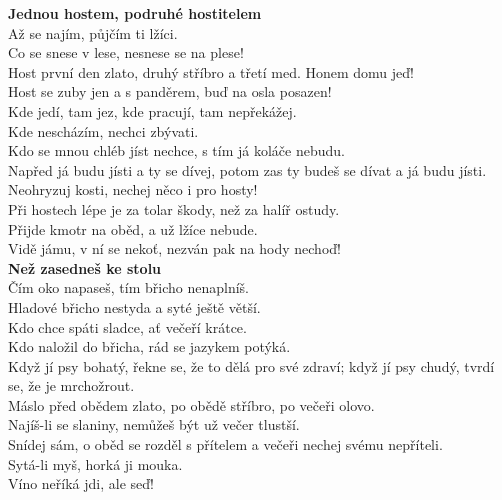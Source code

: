 \begin{multicols}{2}
\noindent
{\large\bf Jednou hostem, podruhé hostitelem}\\[1 mm]
Až se najím, půjčím ti lžíci.\\
Co se snese v lese, nesnese se na plese!\\
Host první den zlato, druhý stříbro a třetí med. Honem domu jeď!\\
Host se zuby jen a s panděrem, buď na osla posazen!\\
Kde jedí, tam jez, kde pracují, tam nepřekážej.\\
Kde nescházím, nechci zbývati.\\
Kdo se mnou chléb jíst nechce, s tím já koláče nebudu.\\
Napřed já budu jísti a ty se dívej, potom zas ty budeš se dívat 
a já budu jísti.\\
Neohryzuj kosti, nechej něco i pro hosty!\\
Při hostech lépe je za tolar škody, než za halíř ostudy.\\
Přijde kmotr na oběd, a už lžíce nebude.\\
Vidě jámu, v ní se nekoť, nezván pak na hody nechoď!\\

\noindent
{\large\bf Než zasedneš ke stolu}\\[1 mm]
Čím oko napaseš, tím břicho nenaplníš.\\
Hladové břicho nestyda a syté ještě větší.\\
Kdo chce spáti sladce, ať večeří krátce.\\
Kdo naložil do břicha, rád se jazykem potýká.\\
Když jí psy bohatý, řekne se, že to dělá pro své zdraví; když 
jí psy chudý, tvrdí se, že je mrchožrout.\\
Máslo před obědem zlato, po obědě stříbro, po večeři olovo.\\
Najíš-li se slaniny, nemůžeš být už večer tlustší.\\
Snídej sám, o oběd se rozděl s přítelem a večeři nechej svému 
nepříteli.\\
Sytá-li myš, horká ji mouka.\\
Víno neříká jdi, ale seď!\\


\end{multicols}
